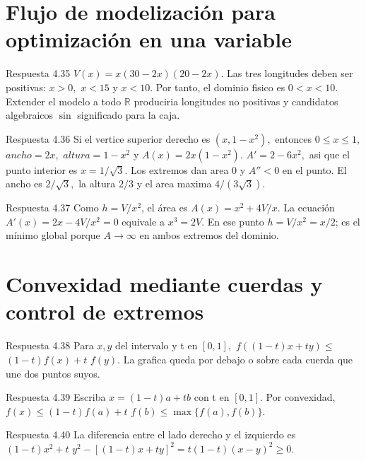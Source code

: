 \documentclass[10pt,a4paper,oneside,openany]{book}
\begin{document}
\section{Flujo de modelización para optimización en una variable}
\begin{PSevenAnswerFixed}{Respuesta 4.35}
\(V(x)=x(30-2x)(20-2x)\). Las tres longitudes deben ser positivas: \(x>0,\) \(x<15\) y \(x<10\). Por tanto, el dominio fisico es \(0<x<10\). Extender el modelo a todo \(\mathbb{R}\) produciria longitudes no positivas y candidatos algebraicos \(\sin\) significado para la caja.
\end{PSevenAnswerFixed}
\begin{PSevenAnswerFixed}{Respuesta 4.36}
Si el vertice superior derecho es \((x,1-x^{2}),\) entonces \(0\le x\le 1,\) \(ancho=2x,\) \(altura=1-x^{2}\) y \(A(x)=2x(1-x^{2})\). \(A'=2-6x^{2},\) asi que el punto interior es \(x=1/\sqrt{3}\). Los extremos dan area \(0\) y \(A''<0\) en el punto. El ancho es \(2/\sqrt{3},\) la altura \(2/3\) y el area maxima \(4/(3\sqrt{3})\).
\end{PSevenAnswerFixed}
\begin{PSevenAnswerFixed}{Respuesta 4.37}
Como \(h=V/x^2\), el área es \(A(x)=x^2+4V/x\). La ecuación \(A'(x)=2x-4V/x^2=0\) equivale a \(x^3=2V\). En ese punto \(h=V/x^2=x/2\); es el mínimo global porque \(A\to\infty\) en ambos extremos del dominio.
\end{PSevenAnswerFixed}
\section{Convexidad mediante cuerdas y control de extremos}
\begin{PSevenAnswerFixed}{Respuesta 4.38}
Para \(x,y\) del intervalo y t en \([0,1],\) \(f((1-t)x+ty)\le \) \((1-t)f(x)+t\) \(f(y)\). La grafica queda por debajo o sobre cada cuerda que une dos puntos suyos.
\end{PSevenAnswerFixed}
\begin{PSevenAnswerFixed}{Respuesta 4.39}
Escriba \(x=(1-t)a+tb\) con t en \([0,1]\). Por convexidad, \(f(x)\le (1-t)f(a)+t\) \(f(b)\le \max\{f(a),f(b)\}\).
\end{PSevenAnswerFixed}
\begin{PSevenAnswerFixed}{Respuesta 4.40}
La diferencia entre el lado derecho y el izquierdo es \((1-t)x^{2}+t\) \(y^{2}-[(1-t)x+ty]^{2}=t(1-t)(x-y)^{2}\ge 0\).
\end{PSevenAnswerFixed}
\end{document}
